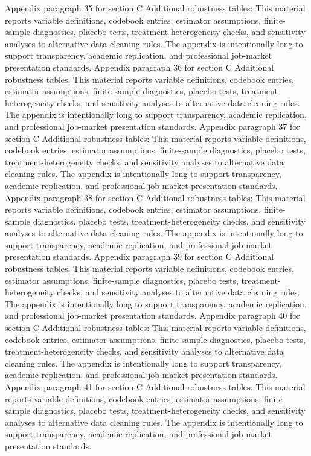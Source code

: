 \documentclass[preprint,12pt]{elsarticle}
\begin{document}
Appendix paragraph 35 for section C Additional robustness tables: This material reports variable definitions, codebook entries, estimator assumptions, finite-sample diagnostics, placebo tests, treatment-heterogeneity checks, and sensitivity analyses to alternative data cleaning rules. The appendix is intentionally long to support transparency, academic replication, and professional job-market presentation standards.
Appendix paragraph 36 for section C Additional robustness tables: This material reports variable definitions, codebook entries, estimator assumptions, finite-sample diagnostics, placebo tests, treatment-heterogeneity checks, and sensitivity analyses to alternative data cleaning rules. The appendix is intentionally long to support transparency, academic replication, and professional job-market presentation standards.
Appendix paragraph 37 for section C Additional robustness tables: This material reports variable definitions, codebook entries, estimator assumptions, finite-sample diagnostics, placebo tests, treatment-heterogeneity checks, and sensitivity analyses to alternative data cleaning rules. The appendix is intentionally long to support transparency, academic replication, and professional job-market presentation standards.
Appendix paragraph 38 for section C Additional robustness tables: This material reports variable definitions, codebook entries, estimator assumptions, finite-sample diagnostics, placebo tests, treatment-heterogeneity checks, and sensitivity analyses to alternative data cleaning rules. The appendix is intentionally long to support transparency, academic replication, and professional job-market presentation standards.
Appendix paragraph 39 for section C Additional robustness tables: This material reports variable definitions, codebook entries, estimator assumptions, finite-sample diagnostics, placebo tests, treatment-heterogeneity checks, and sensitivity analyses to alternative data cleaning rules. The appendix is intentionally long to support transparency, academic replication, and professional job-market presentation standards.
Appendix paragraph 40 for section C Additional robustness tables: This material reports variable definitions, codebook entries, estimator assumptions, finite-sample diagnostics, placebo tests, treatment-heterogeneity checks, and sensitivity analyses to alternative data cleaning rules. The appendix is intentionally long to support transparency, academic replication, and professional job-market presentation standards.
Appendix paragraph 41 for section C Additional robustness tables: This material reports variable definitions, codebook entries, estimator assumptions, finite-sample diagnostics, placebo tests, treatment-heterogeneity checks, and sensitivity analyses to alternative data cleaning rules. The appendix is intentionally long to support transparency, academic replication, and professional job-market presentation standards.
\end{document}
